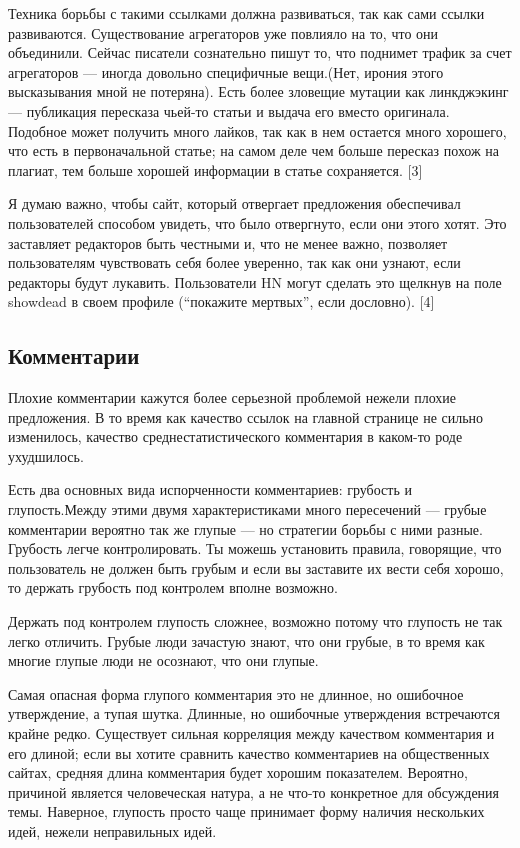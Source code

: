 \documentclass[ebook,12pt,oneside,openany]{memoir}
\begin{document}
Техника борьбы с такими ссылками должна развиваться, так как сами
ссылки развиваются. Существование агрегаторов уже повлияло на то, что
они объединили. Сейчас писатели сознательно пишут то, что поднимет
трафик за счет агрегаторов — иногда довольно специфичные вещи.(Нет,
ирония этого высказывания мной не потеряна). Есть более зловещие
мутации как линкджэкинг — публикация пересказа чьей-то статьи и выдача
его вместо оригинала. Подобное может получить много лайков, так как в
нем остается много хорошего, что есть в первоначальной статье; на
самом деле чем больше пересказ похож на плагиат, тем больше хорошей
информации в статье сохраняется. [3] \newline

Я думаю важно, чтобы сайт, который отвергает предложения обеспечивал
пользователей способом увидеть, что было отвергнуто, если они этого
хотят. Это заставляет редакторов быть честными и, что не менее важно,
позволяет пользователям чувствовать себя более уверенно, так как они
узнают, если редакторы будут лукавить. Пользователи HN могут сделать
это щелкнув на поле showdead в своем профиле (“покажите мертвых”, если
дословно). [4] \newline

\subsection{Комментарии}

Плохие комментарии кажутся более серьезной проблемой нежели плохие
предложения. В то время как качество ссылок на главной странице не
сильно изменилось, качество среднестатистического комментария в
каком-то роде ухудшилось. \newline

Есть два основных вида испорченности комментариев: грубость и
глупость.Между этими двумя характеристиками много пересечений — грубые
комментарии вероятно так же глупые — но стратегии борьбы с ними
разные. Грубость легче контролировать. Ты можешь установить правила,
говорящие, что пользователь не должен быть грубым и если вы заставите
их вести себя хорошо, то держать грубость под контролем вполне
возможно. \newline

Держать под контролем глупость сложнее, возможно потому что глупость
не так легко отличить. Грубые люди зачастую знают, что они грубые, в
то время как многие глупые люди не осознают, что они глупые. \newline

Самая опасная форма глупого комментария это не длинное, но ошибочное
утверждение, а тупая шутка. Длинные, но ошибочные утверждения
встречаются крайне редко. Существует сильная корреляция между
качеством комментария и его длиной; если вы хотите сравнить качество
комментариев на общественных сайтах, средняя длина комментария будет
хорошим показателем. Вероятно, причиной является человеческая натура,
а не что-то конкретное для обсуждения темы. Наверное, глупость просто
чаще принимает форму наличия нескольких идей, нежели неправильных
идей. \newline
\end{document}
